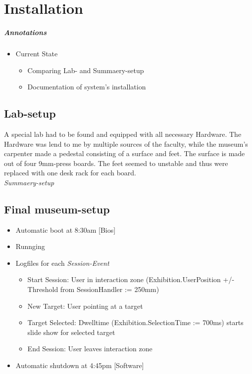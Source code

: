 \chapter{Installation}
\label{installation}

\paragraph{Annotations}

\begin{itemize}
	\item Current State
	\begin{itemize}
		\item Comparing Lab- and Summaery-setup
		\item Documentation of system's installation
	\end{itemize}
\end{itemize}



\section{Lab-setup}
\label{installation_lab}

A special lab had to be found and equipped with all necessary Hardware. The Hardware was lend to me by multiple sources of the faculty, while the museum's carpenter made a pedestal consisting of a surface and feet. The surface is made out of four 9mm-press boards. The feet seemed to unstable and thus were replaced with one desk rack for each board.
\\
\textit{Summaery-setup}


\section{Final museum-setup}

\begin{itemize}
	\item Automatic boot at 8:30am [Bios]
	\item Runnging
	\item Logfiles for each \textit{Session-Event}
	\begin{itemize}
		\item Start Session: User in interaction zone (Exhibition.UserPosition +/- Threshold from SessionHandler := 250mm)
		\item New Target: User pointing at a target
		\item Target Selected: Dwelltime (Exhibition.SelectionTime := 700ms) starts slide show for selected target
		\item End Session: User leaves interaction zone
	\end{itemize}
	\item Automatic shutdown at 4:45pm [Software]
\end{itemize}